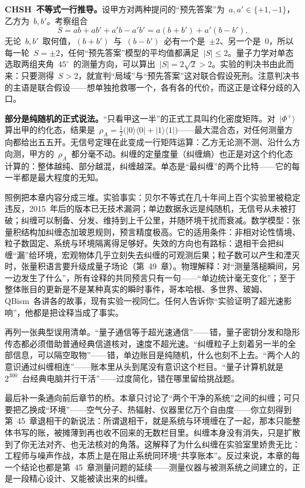 \begin{challenge}
\textbf{CHSH~不等式一行推导。}设甲方对两种提问的“预先答案”为~\(a,a'\in\{+1,-1\}\)，乙方为~\(b,b'\)。考察组合
\[
S=ab+ab'+a'b-a'b'=a(b+b')+a'(b-b').
\]
无论~\(b,b'\)~取何值，\((b+b')\)~与~\((b-b')\)~必有一个是~\(\pm2\)、另一个是~0，所以每一轮~\(S=\pm2\)，任何“预先答案”模型的平均值都满足~\(|S|\leq2\)。量子力学对单态选取两组夹角~\(45^\circ\)~的测量方向，可以算出~\(|S|=2\sqrt2>2\)。实验的判决书由此而来：只要测得~\(S>2\)，就宣判“局域”与“预先答案”这对联合假设死刑。注意判决书的主语是联合假设——想单独抢救哪一个，各有各的代价，而这正是诠释分歧的入口。

\textbf{部分是纯随机的正式说法。}“只看甲这一半”的正式工具叫约化密度矩阵。对~\(|\Phi^{+}\rangle\) 算出甲的约化态，结果是~\(\rho_A=\tfrac12\big(|0\rangle\langle0|+|1\rangle\langle1|\big)\)——最大混合态，对任何测量方向都给出五五开。无信号定理在此变成一行矩阵运算：乙方无论测不测、沿什么方向测，甲方的~\(\rho_A\)~都分毫不动。纠缠的定量度量（纠缠熵）也正是对这个约化态计算的：整体越纯、部分越混，纠缠越深。单态是“最纠缠”的两个比特——它的每一半都是最大程度的无知。
\end{challenge}


照例把本章内容分成三堆。实验事实：贝尔不等式在几十年间上百个实验里被稳定违反，2015~年后的版本已无技术漏洞；单边数据永远是纯随机，无信号从未被打破；纠缠可以制备、分发、维持到上千公里，并随环境干扰而衰减。数学模型：张量积结构加纠缠态加玻恩规则，预言精度极高。它的适用条件：非相对论性情境、粒子数固定、系统与环境隔离得足够好。失效的方向也有路标：退相干会把纠缠“漏”给环境，宏观物体几乎立刻失去纠缠的可观测后果；粒子数可以产生和湮灭时，张量积语言要升级成量子场论（第~49~章）。物理解释：对“测量落槌瞬间，另一边发生了什么”，所有诠释的共同预言只有一句——“单边统计毫无变化”；至于整体账目的更新是不是某种真实的瞬时事件，哥本哈根、多世界、玻姆、QBism~各讲各的故事，现有实验一视同仁。任何人告诉你“实验证明了超光速影响”，他都是把诠释当成了事实。

再列一张典型误用清单。“量子通信等于超光速通信”——错，量子密钥分发和隐形传态都必须借助普通经典信道核对，速度不超光速。“纠缠粒子上刻着另一半的全部信息，可以隔空取物”——错，单边账目是纯随机，什么也刻不上去。“两个人的意识通过纠缠相连”——账本里从头到尾没有意识这个栏目。“量子计算机就是~\(2^{300}\)~台经典电脑并行干活”——过度简化，错在哪里留给挑战题。

最后补一条通向前后章节的桥。本章只讨论了“两个干净的系统”之间的纠缠；可只要把乙换成“环境”——空气分子、热辐射、仪器里亿万个自由度——你立刻得到第~45~章退相干的新说法：所谓退相干，就是系统与环境缠在了一起，那本只能整体书写的账，被摊薄到再也收不回来的无数栏目里。纠缠本身没有消失，只是扩散到了你无法对齐、也无法核对的角落。这解释了为什么纠缠在实验室里娇贵无比：工程师与噪声作战，本质上是在阻止系统同环境“共享账本”。反过来说，本章的每一个结论也都是第~45~章测量问题的延续——测量仪器与被测系统之间建立的，正是一段精心设计、又能被读出来的纠缠。

